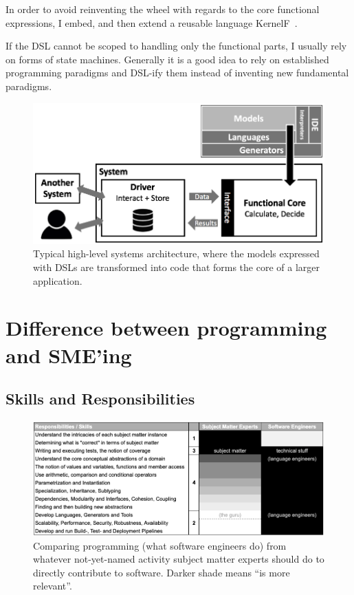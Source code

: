 \documentclass[runningheads]{llncs}
\begin{document}
In order to avoid reinventing the wheel with regards to the core functional
expressions, I embed, and then extend a reusable language
KernelF~\cite{volter2018design}.

If the DSL cannot be scoped to handling only the functional parts, I usually
rely on forms of state machines. Generally it is a good idea to rely on
established programming paradigms and DSL-ify them instead of inventing new
fundamental paradigms.



\begin{figure}[t]
\begin{center}
    \includegraphics[width=1\columnwidth]{figures/arch.png}
    \caption{Typical high-level systems architecture, where the models
    expressed with DSLs are transformed into code that forms the core
    of a larger application.}
    \label{arch}
\end{center} 
\end{figure} 



\section{Difference between programming and SME'ing}
\label{canTheyDoIt}




\subsection{Skills and Responsibilities}

\begin{figure}[t]
\begin{center}
    \includegraphics[width=1\columnwidth]{figures/table-respo.png}
    \caption{Comparing programming (what software engineers do) from
    whatever not-yet-named activity subject matter experts should do to 
    directly contribute to software. Darker shade means ``is more relevant''.}
    \label{table-respo}
\end{center} 
\end{figure} 
\end{document}

